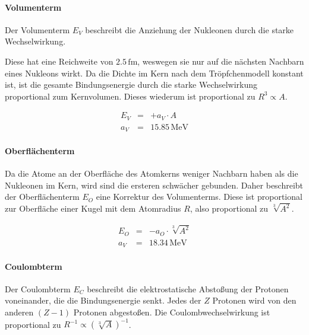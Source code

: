 \documentclass[12pt,a4paper]{scrartcl}
\numberwithin{equation}{section} %
\renewcommand{\[}{} %
\renewcommand{\]}{\noindent} %
\begin{document}
\hypertarget{volumenterm}{%
\paragraph{Volumenterm}\label{volumenterm}}

Der Volumenterm \(E_V\) beschreibt die Anziehung der Nukleonen durch die
starke Wechselwirkung.

Diese hat eine Reichweite von \(2.5\mathrm{\,fm}\), weswegen sie nur auf
die nächsten Nachbarn eines Nukleons wirkt. Da die Dichte im Kern nach
dem Tröpfchenmodell konstant ist, ist die gesamte Bindungsenergie durch
die starke Wechselwirkung proportional zum Kernvolumen. Dieses wiederum
ist proportional zu \(R^3\propto A\).

\[
\begin{eqnarray}
    E_V &=& + a_V\cdot A \label{Volumenterm} \\
    a_V &=& 15.85\mathrm{\,MeV}
\end{eqnarray}
\]

\hypertarget{oberfluxe4chenterm}{%
\paragraph{Oberflächenterm}\label{oberfluxe4chenterm}}

Da die Atome an der Oberfläche des Atomkerns weniger Nachbarn haben als
die Nukleonen im Kern, wird sind die ersteren schwächer gebunden. Daher
beschreibt der Oberflächenterm \(E_O\) eine Korrektur des Volumenterms.
Diese ist proportional zur Oberfläche einer Kugel mit dem Atomradius
\(R\), also proportional zu \(\sqrt[3]{A^2}\).

\[
\begin{eqnarray}
    E_O &=& - a_O\cdot \sqrt[3]{A^2} \label{Oberflächenterm} \\
    a_V &=& 18.34\mathrm{\,MeV}
\end{eqnarray}
\]

\hypertarget{coulombterm}{%
\paragraph{Coulombterm}\label{coulombterm}}

Der Coulombterm \(E_C\) beschreibt die elektrostatische Abstoßung der
Protonen voneinander, die die Bindungsenergie senkt. Jedes der \(Z\)
Protonen wird von den anderen \((Z-1)\) Protonen abgestoßen. Die
Coulombwechselwirkung ist proportional zu
\(R^{-1}\propto\left(\sqrt[3]{A}\right)^{-1}\).
\end{document}
